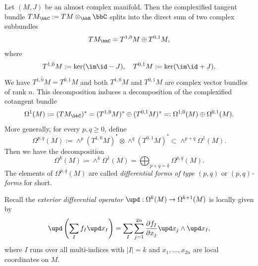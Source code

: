 Let \((M,J)\) be an almost complex manifold.
Then the complexified tangent bundle \(TM_\bbC  := TM \otimes_\bbR \bbC\) splits into the direct sum of two complex subbundles
\[ T M_\bbC = T^{1,0}M \oplus T^{0,1}M, \]
where
\[ T^{1,0}M := \ker (\im \id - J), \quad T^{0,1}M := \ker (\im \id + J). \]
We have \(\overline{T^{1,0}M} = T^{0,1}M\) and both \(T^{1,0}M\) and \(T^{0,1}M\) are complex vector bundles of rank \(n\).
This decomposition induces a decomposition of the complexified cotangent bundle
\[ \Omega^1(M) := (TM_\bbC)^* = (T^{1,0}M)^* \oplus (T^{0,1}M)^* =: \Omega^{1,0}(M) \oplus \Omega^{0,1}(M). \]
More generally, for every \(p,q \geq 0\), define
\[ \Omega^{p,q}(M) := \wedge^p (T^{1,0}M)^* \otimes \wedge^q (T^{0,1}M)^* \subset \wedge^{p+q} \Omega^1(M). \]
Then we have the decomposition
\[ \Omega^k(M) \coloneqq \wedge^k \Omega^1(M) = \bigoplus_{p+q=k} \Omega^{p,q}(M). \]
The elements of \(\Omega^{p,q}(M)\) are called \emph{differential forms of type \((p,q)\)} or \emph{\((p,q)\)-forms} for short.

Recall the \emph{exterior differential operator} \(\upd:\Omega^k(M) \to \Omega^{k+1}(M)\) is locally given by
\[ \upd\left(\sum_I f_I \upd x_I\right) = \sum_I \sum_{j=1}^{2n} \frac{\partial f_I}{\partial x_j} \upd x_j \wedge \upd x_I, \]
where \(I\) runs over all multi-indices with \(|I| = k\) and \(x_1, \ldots, x_{2n}\) are local coordinates on \(M\).

